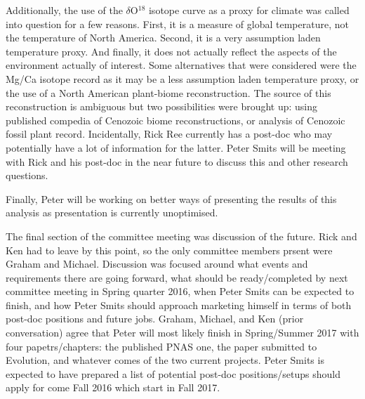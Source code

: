 \documentclass{article}
\begin{document}
Additionally, the use of the \(\delta\)O\(^{18}\) isotope curve as a proxy for climate was called into question for a few reasons. First, it is a measure of global temperature, not the temperature of North America. Second, it is a very assumption laden temperature proxy. And finally, it does not actually reflect the aspects of the environment actually of interest. Some alternatives that were considered were the Mg/Ca isotope record as it may be a less assumption laden temperature proxy, or the use of a North American plant-biome reconstruction. The source of this reconstruction is ambiguous but two possibilities were brought up: using published compedia of Cenozoic biome reconstructions, or analysis of Cenozoic fossil plant record. Incidentally, Rick Ree currently has a post-doc who may potentially have a lot of information for the latter. Peter Smits will be meeting with Rick and his post-doc in the near future to discuss this and other research questions.

Finally, Peter will be working on better ways of presenting the results of this analysis as presentation is currently unoptimised.

The final section of the committee meeting was discussion of the future. Rick and Ken had to leave by this point, so the only committee members prsent were Graham and Michael. Discussion was focused around what events and requirements there are going forward, what should be ready/completed by next committee meeting in Spring quarter 2016, when Peter Smits can be expected to finish, and how Peter Smits should approach marketing himself in terms of both post-doc positions and future jobs. Graham, Michael, and Ken (prior conversation) agree that Peter will most likely finish in Spring/Summer 2017 with four papetrs/chapters: the published PNAS one, the paper submitted to Evolution, and whatever comes of the two current projects. Peter Smits is expected to have prepared a list of potential post-doc positions/setups should apply for come Fall 2016 which start in Fall 2017. 
\end{document}
